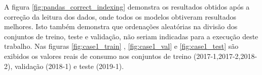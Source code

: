 \documentclass[	12pt, Times, openright, twoside, a4paper, english, brazil]{abntex2}
\begin{document}
                    A figura \ref{fig:pandas_correct_indexing} demonstra os resultados obtidos após a correção da leitura dos dados, onde todos os modelos obtiveram resultados melhores. 
                    Isto também demonstra que ordenações aleatórias na divisão dos conjuntos de treino, teste e validação, não seriam indicadas para a execução deste trabalho.
                    Nas figuras \ref{fig:case1_train} , \ref{fig:case1_val} e \ref{fig:case1_test}   são exibidos os valores reais de consumo nos conjuntos de treino (2017-1,2017-2,2018-2), validação (2018-1) e teste (2019-1).
                    {  \begin{center}
                    \begin{minipage}[c]{0.45\textwidth}
                        \begin{figure}[H]
                        \end{figure}
                        \end{minipage} \hfill %
                          \begin{minipage}[c]{0.45\textwidth}
                        \begin{figure}[H]

\end{figure}
\end{minipage}
\end{center}}
\end{document}

